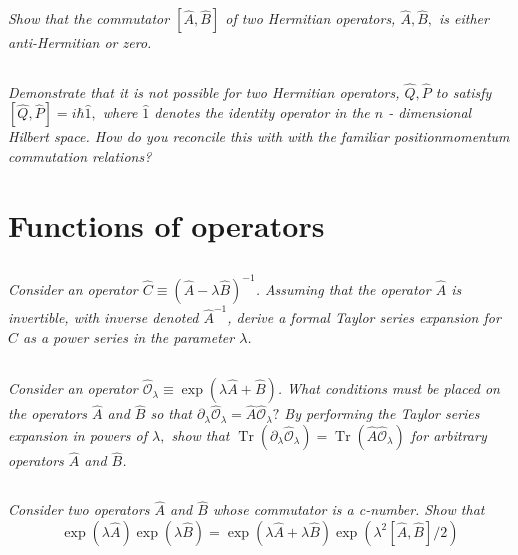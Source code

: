 \documentclass[12pt, letterpaper]{article}
\begin{document}
\subsection{}
\textit{Show that the commutator $[\hat{A}, \hat{B}]$ of two Hermitian operators, $\hat{A}, \hat{B},$ is either anti-Hermitian or zero.}
\subsection{}
\textit{Demonstrate that it is not possible for two Hermitian operators, $\hat{Q}, \hat{P}$ to satisfy $[\hat{Q}, \hat{P}]=i \hbar \hat{1},$ where $\hat{1}$ denotes the identity operator in the $n$ - dimensional Hilbert space. How do you reconcile this with with the familiar positionmomentum commutation relations?}

\section{Functions of operators}
\subsection{}
\textit{Consider an operator $\hat{C} \equiv(\hat{A}-\lambda \hat{B})^{-1}$. Assuming that the operator $\hat{A}$ is invertible, with inverse denoted $\hat{A}^{-1}$, derive a formal Taylor series expansion for $\hat{C}$ as a power series in the parameter $\lambda$.}
\subsection{}
\textit{Consider an operator $\hat{\mathcal{O}}_{\lambda} \equiv \exp (\lambda \hat{A}+\hat{B})$. What conditions must be placed on the operators $\hat{A}$ and $\hat{B}$ so that $\partial_{\lambda} \hat{\mathcal{O}}_{\lambda}=\hat{A} \hat{\mathcal{O}}_{\lambda} ?$ By performing the Taylor series expansion in powers of $\lambda,$ show that $\operatorname{Tr}\left(\partial_{\lambda} \hat{\mathcal{O}}_{\lambda}\right)=\operatorname{Tr}\left(\hat{A} \hat{\mathcal{O}}_{\lambda}\right)$ for
arbitrary operators $\hat{A}$ and $\hat{B}$.}
\subsection{}
\textit{Consider two operators $\hat{A}$ and $\hat{B}$ whose commutator is a c-number. Show that 
$$\exp (\lambda \hat{A}) \exp (\lambda \hat{B})=\exp \left(\lambda \hat{A}+\lambda \hat{B} \right)  \exp \left(\lambda^{2}[\hat{A}, \hat{B}] / 2\right)$$}
\end{document}
